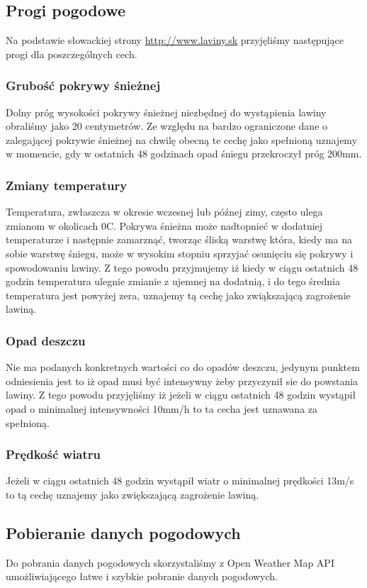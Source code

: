 \subsection{Progi pogodowe}
Na podstawie słowackiej strony \url{http://www.laviny.sk} przyjęliśmy następujące progi dla poszczególnych cech.
\subsubsection{Grubość pokrywy śnieżnej}
Dolny próg wysokości pokrywy śnieżnej niezbędnej do wystąpienia lawiny obraliśmy jako 20 centymetrów. Ze względu na bardzo ograniczone dane o zalegającej pokrywie śnieżnej na chwilę obecną te cechę jako spełnioną uznajemy w momencie, gdy w ostatnich 48 godzinach opad śniegu przekroczył próg 200mm.
\subsubsection{Zmiany temperatury}
Temperatura, zwłaszcza w okresie wczesnej lub późnej zimy, często ulega zmianom w okolicach 0\degree C.
Pokrywa śnieżna może nadtopnieć w dodatniej temperaturze i następnie zamarznąć, tworząc śliską warstwę która, kiedy ma na sobie warstwę śniegu, może w wysokim stopniu sprzyjać osunięciu się pokrywy i spowodowaniu lawiny. Z tego powodu przyjmujemy iż kiedy w ciągu ostatnich 48 godzin temperatura ulegnie zmianie z ujemnej na dodatnią, i do tego średnia temperatura jest powyżej zera, uznajemy tą cechę jako zwiąkszającą zagrożenie lawiną.
\subsubsection{Opad deszczu}
Nie ma podanych konkretnych wartości co do opadów deszczu, jedynym punktem odniesienia jest to iż opad musi być intensywny żeby przyczynił sie do powstania lawiny. Z tego powodu przyjęliśmy iż jeżeli w ciągu ostatnich 48 godzin wystąpił opad o minimalnej intensywności 10mm/h to ta cecha jest uznawana za spełnioną.
\subsubsection{Prędkość wiatru}
Jeżeli w ciągu ostatnich 48 godzin wystąpił wiatr o minimalnej prędkości 13m/s to tą cechę uznajemy jako zwiększającą zagrożenie lawiną.

\subsection{Pobieranie danych pogodowych}
Do pobrania danych pogodowych skorzystaliśmy z Open Weather Map API umożliwiającego łatwe i szybkie pobranie danych pogodowych.




